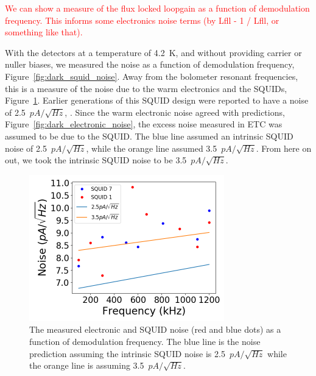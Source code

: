 \textcolor{red}{We can show a measure of the flux locked loopgain as a function of demodulation frequency. This informs some electronics noise terms (by Lfll - 1 / Lfll, or something like that).} 

With the detectors at a temperature of 4.2~K, and without providing carrier or nuller biases, we measured the noise as a function of demodulation frequency, Figure~\ref{fig:dark_squid_noise}. 
Away from the bolometer resonant frequencies, this is a measure of the noise due to the warm electronics and the \ac{SQUID}s, Figure~\ref{fig:adjust_squid}. 
Earlier generations of this \ac{SQUID} design were reported to have a noise of 2.5~$pA/\sqrt{Hz}$, \cite{Huber2001}.
Since the warm electronic noise agreed with predictions, Figure~\ref{fig:dark_electronic_noise}, the excess noise measured in \ac{ETC} was assumed to be due to the \ac{SQUID}. 
The blue line assumed an intrinsic \ac{SQUID} noise of 2.5~$pA/\sqrt{Hz}$, while the orange line assumed 3.5~$pA/\sqrt{Hz}$.
From here on out, we took the intrinsic \ac{SQUID} noise to be 3.5~$pA/\sqrt{Hz}$.


\begin{figure}[ht!]
\begin{center}
\includegraphics[height=2.5in]{figures/adjusting_squid_noise.png}
\caption{The measured electronic and \ac{SQUID} noise (red and blue dots) as a function of demodulation frequency. The blue line is the noise prediction assuming the intrinsic \ac{SQUID} noise is 2.5~$pA/\sqrt{Hz}$ while the orange line is assuming 3.5~$pA/\sqrt{Hz}$.  
\label{fig:adjust_squid} }
\end{center}
\end{figure}



